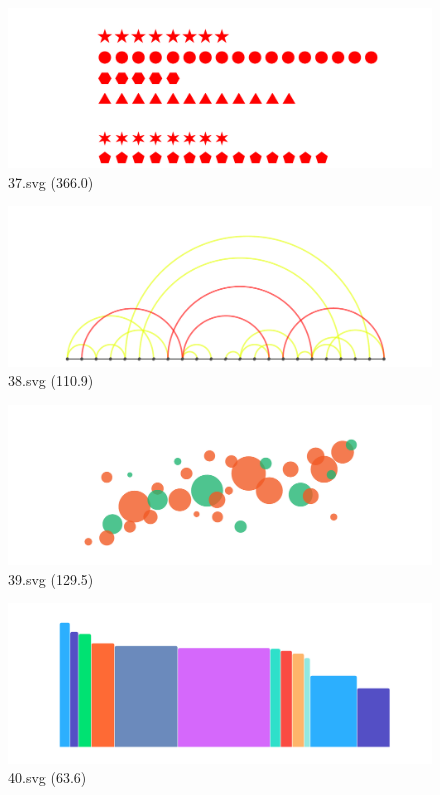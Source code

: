 \documentclass[journal]{IEEEtran}
\begin{document}
\begin{figure}[!htbp]
\centering
\begin{minipage}{0.233\columnwidth}
\centering
\includegraphics[width=\textwidth]{Train_set/37.pdf}
{37.svg (366.0)}
\end{minipage}
\hfill
\begin{minipage}{0.233\columnwidth}
\centering
\includegraphics[width=\textwidth]{Train_set/38.pdf}
{38.svg (110.9)}
\end{minipage}
\hfill
\begin{minipage}{0.233\columnwidth}
\centering
\includegraphics[width=\textwidth]{Train_set/39.pdf}
{39.svg (129.5)}
\end{minipage}
\hfill
\begin{minipage}{0.233\columnwidth}
\centering
\includegraphics[width=\textwidth]{Train_set/40.pdf}
{40.svg (63.6)}
\end{minipage}
\end{figure}
\end{document}

